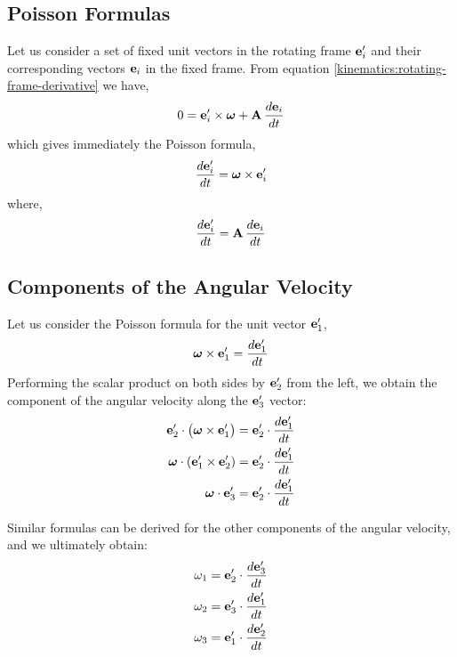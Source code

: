 \documentclass[12pt]{article}
\begin{document}
\subsection{Poisson Formulas}

Let us consider a set of fixed unit vectors in the rotating frame $\vb{e}'_i$ and their
corresponding vectors $\vb{e}_i$ in the fixed frame. From equation \eqref{kinematics:rotating-frame-derivative} we
have,
\begin{equation}
  0 = \vb{e}'_i \times \boldsymbol{\omega} + \vb{A}\,\frac{d\vb{e}_i}{dt}
\end{equation}
which gives immediately the Poisson formula,
\begin{equation}
  \frac{d\vb{e}'_i}{dt} = \boldsymbol{\omega} \times \vb{e}'_i
\end{equation}
where,
\begin{equation}
  \frac{d\vb{e}'_i}{dt} = \vb{A}\,\frac{d\vb{e}_i}{dt}
\end{equation}

\subsection{Components of the Angular Velocity}

Let us consider the Poisson formula for the unit vector $\vb{e}'_1$,
\begin{equation}
  \boldsymbol{\omega} \times \vb{e}'_1 = \frac{d\vb{e}'_1}{dt}
\end{equation}
Performing the scalar product on both sides by $\vb{e}'_2$ from the left, we obtain the
component of the angular velocity along the $\vb{e}'_3$ vector:
\begin{align}
  \vb{e}'_2 \cdot \bigl(\boldsymbol{\omega} \times \vb{e}'_1\bigr)
    &= \vb{e}'_2 \cdot \frac{d\vb{e}'_1}{dt} \\
  \boldsymbol{\omega} \cdot (\vb{e}'_1 \times \vb{e}'_2)
    &= \vb{e}'_2 \cdot \frac{d\vb{e}'_1}{dt} \\
  \boldsymbol{\omega} \cdot \vb{e}'_3
    &= \vb{e}'_2 \cdot \frac{d\vb{e}'_1}{dt}
\end{align}

Similar formulas can be derived for the other components of the angular velocity, and we
ultimately obtain:
\begin{align}
  \omega_1 &= \vb{e}'_2 \cdot \frac{d\vb{e}'_3}{dt} \\
  \omega_2 &= \vb{e}'_3 \cdot \frac{d\vb{e}'_1}{dt} \\
  \omega_3 &= \vb{e}'_1 \cdot \frac{d\vb{e}'_2}{dt}
\end{align}
\end{document}
